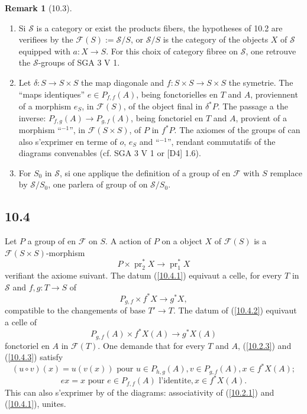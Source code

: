 \documentclass[12pt,a4paper]{article}
\theoremstyle{plain}
\theoremstyle{definition}
\newtheorem{remark}[theorem]{Remark}
\theoremstyle{remark}
\DeclareMathOperator{\pr}{pr}
\begin{document}
\begin{remark}[10.3]
\leavevmode
\begin{enumerate}[label=(\roman*)]
\item Si $\mathcal{S}$ is a category or exist the products fibers, the hypotheses of 10.2 are verifiees by the $\mathcal{F}(S) := \mathcal{S}/S$, or $\mathcal{S}/S$ is the category of the objects $X$ of $\mathcal{S}$ equipped with $a: X \to S$. For this choix of category fibree on $\mathcal{S}$, one retrouve the $\mathcal{S}$-groups of SGA 3 V 1.

\item Let $\delta: S \to S \times S$ the map diagonale and $f: S \times S \to S \times S$ the symetrie. The ``maps identiques'' $e \in P_{f,f}(A)$, being fonctorielles en $T$ and $A$, proviennent of a morphism $e_S$, in $\mathcal{F}(S)$, of the object final in $\delta^* P$. The passage a the inverse: $P_{f,g}(A) \to P_{g,f}(A)$, being fonctoriel en $T$ and $A$, provient of a morphism ``${}^{-1}$'', in $\mathcal{F}(S \times S)$, of $P$ in $f^* P$. The axiomes of the groups of can also s'exprimer en terme of $o$, $e_S$ and ``${}^{-1}$'', rendant commutatifs of the diagrams convenables (cf. SGA 3 V 1 or [D4] 1.6).

\item For $S_0$ in $\mathcal{S}$, si one applique the definition of a group of en $\mathcal{F}$ with $S$ remplace by $\mathcal{S}/S_0$, one parlera of group of on $\mathcal{S}/S_0$.
\end{enumerate}
\end{remark}

\subsection*{10.4}

Let $P$ a group of en $\mathcal{F}$ on $S$. A action of $P$ on a object $X$ of $\mathcal{F}(S)$ is a $\mathcal{F}(S \times S)$-morphism
\begin{equation}\label{10.4.1}
P \times \pr_2^* X \longrightarrow \pr_1^* X \tag{10.4.1}
\end{equation}
verifiant the axiome suivant. The datum (\ref{10.4.1}) equivaut a celle, for every $T$ in $\mathcal{S}$ and $f, g: T \to S$ of
\begin{equation}\label{10.4.2}
P_{g,f} \times f^* X \longrightarrow g^* X, \tag{10.4.2}
\end{equation}
compatible to the changements of base $T' \to T$. The datum of (\ref{10.4.2}) equivaut a celle of
\begin{equation}\label{10.4.3}
P_{g,f}(A) \times f^* X(A) \longrightarrow g^* X(A) \tag{10.4.3}
\end{equation}
fonctoriel en $A$ in $\mathcal{F}(T)$. One demande that for every $T$ and $A$, (\ref{10.2.3}) and (\ref{10.4.3}) satisfy
$$(u \circ v)(x) = u(v(x)) \text{ pour } u \in P_{h,g}(A), v \in P_{g,f}(A), x \in f^* X(A);$$
$$ex = x \text{ pour } e \in P_{f,f}(A) \text{ l'identite}, x \in f^* X(A).$$
This can also s'exprimer by of the diagrams: associativity of (\ref{10.2.1}) and (\ref{10.4.1}), unites.
\end{document}
